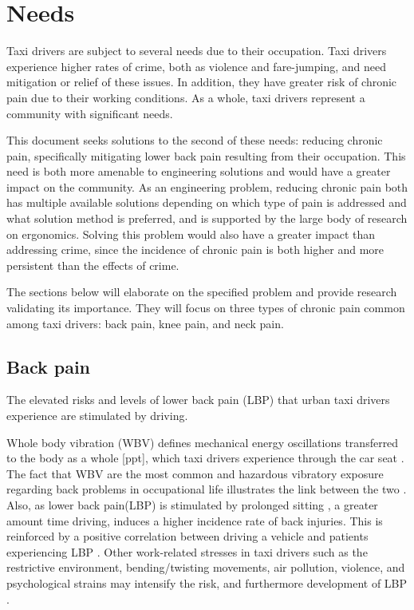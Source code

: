 \documentclass[11pt]{article}
\begin{document}
\section{Needs}
\label{sec:needs}
Taxi drivers are subject to several needs due to their
occupation. Taxi drivers experience higher rates of crime, both as
violence and fare-jumping\cite{policeverywherejustnowhere}, and need
mitigation or relief of these issues. In
addition, they have greater risk of chronic pain due to their working
conditions\cite{ODrivers@Risk,KneePain,POSTULATED}. As a whole, taxi
drivers represent a community with significant needs. 

This document seeks solutions to the second of these needs: reducing
chronic pain, specifically mitigating lower back pain resulting from
their occupation. This need is both more amenable to engineering solutions
and would have a greater impact on the community. As an engineering
problem, reducing chronic pain both has multiple available solutions
depending on which type of pain is addressed and what solution method
is preferred, and is supported by the large body of research on
ergonomics. Solving this problem would also have a greater impact than
addressing crime, since the incidence of chronic pain is both higher
and more persistent than the effects of crime.

The sections below will elaborate on the specified problem and provide
research validating its importance. They will focus on three types of
chronic pain common among taxi drivers: back pain, knee pain, and neck
pain. 
\subsection{Back pain}
The elevated risks and levels of lower back pain (LBP) that urban taxi drivers 
experience are stimulated by driving. 

Whole body vibration (WBV) defines mechanical energy oscillations transferred to 
the body as a whole [ppt], which taxi drivers experience \cite{KneePain, Serious} 
through the car seat \cite{ppt}. The fact that WBV are the most common and hazardous 
vibratory exposure regarding back problems in occupational life illustrates the
link between the two \cite{ODrivers@Risk}. Also, as lower back pain(LBP) is stimulated by 
prolonged sitting \cite{Okunribido2008}, a greater amount time driving, induces a 
higher incidence rate of back injuries\cite{Question?}. This is reinforced by a positive 
correlation between driving a vehicle and patients experiencing LBP \cite{ODrivers@Risk}. 
Other work-related stresses in taxi drivers such as the restrictive environment, bending/twisting 
movements, air pollution, violence, and psychological strains may intensify the risk, 
and furthermore development of LBP \cite{KneePain, POSTULATED}. 
\end{document}
